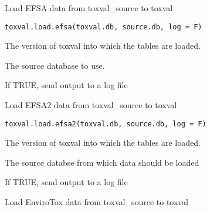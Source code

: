\documentclass[letterpaper]{book}
\begin{document}
%
\begin{Description}\relax
Load EFSA data from toxval\_source to toxval
\end{Description}
%
\begin{Usage}
\begin{verbatim}
toxval.load.efsa(toxval.db, source.db, log = F)
\end{verbatim}
\end{Usage}
%
\begin{Arguments}
\begin{ldescription}
\item[\code{toxval.db}] The version of toxval into which the tables are loaded.

\item[\code{source.db}] The source database to use.

\item[\code{log}] If TRUE, send output to a log file
\end{ldescription}
\end{Arguments}
%
\begin{Description}\relax
Load EFSA2 data from toxval\_source to toxval
\end{Description}
%
\begin{Usage}
\begin{verbatim}
toxval.load.efsa2(toxval.db, source.db, log = F)
\end{verbatim}
\end{Usage}
%
\begin{Arguments}
\begin{ldescription}
\item[\code{toxval.db}] The version of toxval into which the tables are loaded.

\item[\code{source.db}] The source databse from which data should be loaded

\item[\code{log}] If TRUE, send output to a log file
\end{ldescription}
\end{Arguments}
%
\begin{Description}\relax
Load EnviroTox data from toxval\_source to toxval
\end{Description}
\end{document}
